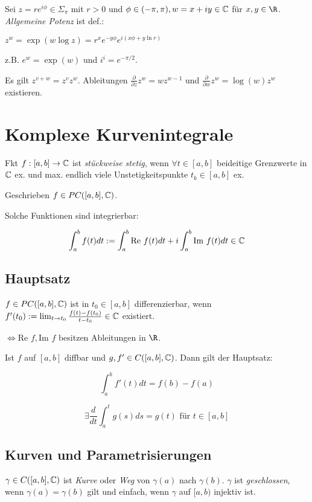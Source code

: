Sei $z = re^{i\phi} \in \Sigma_\pi$ mit $r > 0$ und $\phi \in (-\pi,\pi), w = x + iy \in \mathbb{C}$ für $x, y \in \R$. \emph{Allgemeine Potenz} ist def.:

$z^w = \exp(w \log z) = r^x e^{-y\phi} e^{i(x\phi + y \ln r)}$

z.B. $e^w = \exp(w)$ und $i^i = e^{-\pi/2}$.

\spacing

Es gilt $z^{v+w} = z^v z^w$. Ableitungen $\frac{\partial}{\partial z} z^w = wz^{w-1}$ und $\frac{\partial}{\partial w} z^w = \log(w)z^w$ existieren.

\section*{Komplexe Kurvenintegrale}

Fkt $f : [a,b] \to \mathbb{C}$ ist \emph{stückweise stetig}, wenn $\forall t \in [a,b]$ beideitige Grenzwerte in $\mathbb{C}$ ex. und max. endlich viele Unstetigkeitspunkte $t_k \in [a,b]$ ex.

Geschrieben $f \in PC([a,b],\mathbb{C})$.

Solche Funktionen sind integrierbar:

\vspace*{-4mm}
$$\int_a^b f(t) dt := \int_a^b \text{Re } f(t) dt + i \int_a^b \text{Im } f(t) dt \in \mathbb{C}$$

\subsection*{Hauptsatz}

$f \in PC([a,b],\mathbb{C})$ ist in $t_0 \in [a,b]$ differenzierbar, wenn $f'(t_0) := \lim_{t \to t_0} \frac{f(t)-f(t_0)}{t-t_0} \in \mathbb{C}$ existiert.

$\iff \text{Re } f, \text{Im } f$ besitzen Ableitungen in $\R$.

Ist $f$ auf $[a,b]$ diffbar und $g, f' \in C([a,b],\mathbb{C})$. Dann gilt der Hauptsatz:

\vspace*{-3mm}
$$\int_a^b f'(t) dt = f(b) - f(a)$$

$$\exists \frac{d}{dt} \int_a^t g(s) ds = g(t) \text{ für } t \in [a,b]$$

\subsection*{Kurven und Parametrisierungen}

$\gamma \in C([a,b],\mathbb{C})$ ist \emph{Kurve} oder \emph{Weg} von $\gamma(a)$ nach $\gamma(b)$. $\gamma$ ist \emph{geschlossen}, wenn $\gamma(a)=\gamma(b)$ gilt und einfach, wenn $\gamma$ auf $[a,b)$ injektiv ist.

